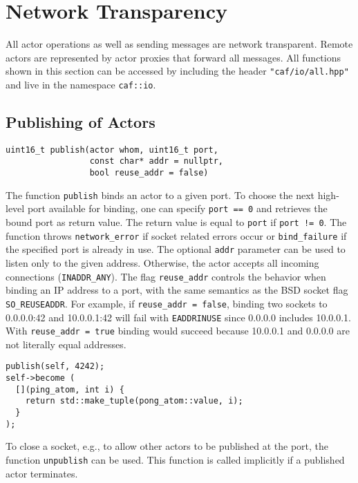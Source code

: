 \section{Network Transparency}
\label{network}

All actor operations as well as sending messages are network transparent.
Remote actors are represented by actor proxies that forward all messages.
All functions shown in this section can be accessed by including the header \lstinline^"caf/io/all.hpp"^ and live in the namespace \lstinline^caf::io^.

\subsection{Publishing of Actors}

\begin{lstlisting}
uint16_t publish(actor whom, uint16_t port,
                 const char* addr = nullptr,
                 bool reuse_addr = false)
\end{lstlisting}

The function \lstinline^publish^ binds an actor to a given port.
To choose the next high-level port available for binding, one can specify \lstinline^port == 0^ and retrieves the bound port as return value.
The return value is equal to \lstinline^port^ if \lstinline^port != 0^.
The function throws \lstinline^network_error^ if socket related errors occur or \lstinline^bind_failure^ if the specified port is already in use.
The optional \lstinline^addr^ parameter can be used to listen only to the given address.
Otherwise, the actor accepts all incoming connections (\lstinline^INADDR_ANY^).
The flag \lstinline^reuse_addr^ controls the behavior when binding an IP
address to a port, with the same semantics as the BSD socket flag \lstinline^SO_REUSEADDR^.
For example, if \lstinline^reuse_addr = false^, binding two sockets to 0.0.0.0:42 and 10.0.0.1:42 will fail with \texttt{EADDRINUSE} since 0.0.0.0 includes 10.0.0.1. 
With \lstinline^reuse_addr = true^ binding would succeed because 10.0.0.1 and
0.0.0.0 are not literally equal addresses.


\begin{lstlisting}
publish(self, 4242);
self->become (
  [](ping_atom, int i) {
    return std::make_tuple(pong_atom::value, i);
  }
);
\end{lstlisting}

To close a socket, e.g., to allow other actors to be published at the port, the function \lstinline^unpublish^ can be used.
This function is called implicitly if a published actor terminates.

